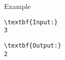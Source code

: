 Example
\begin{verbatim}
\textbf{Input:}
3\end{verbatim}
\begin{verbatim}
\textbf{Output:}
2
\end{verbatim}
